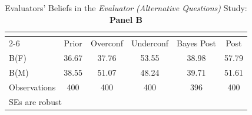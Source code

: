 \begin{table}[htbp]\centering
\caption{Evaluators' Beliefs in the \textit{Evaluator (Alternative Questions)} Study: \textbf{Panel B}}
\begin{tabular}{l*{5}{c}}
\hline\hline
                &\multicolumn{5}{c}{}                             \\\cmidrule(lr){2-6}
                &\multicolumn{1}{c}{Prior}&\multicolumn{1}{c}{Overconf}&\multicolumn{1}{c}{Underconf}&\multicolumn{1}{c}{Bayes Post}&\multicolumn{1}{c}{Post}\\
\hline
B(F)            &    36.67&    37.76&    53.55&    38.98&    57.79\\
B(M)            &    38.55&    51.07&    48.24&    39.71&    51.61\\
\hline
Observations    &      400&      400&      400&      396&      400\\
\hline\hline
\multicolumn{6}{l}{\footnotesize SEs are robust}\\
\end{tabular}
\end{table}
